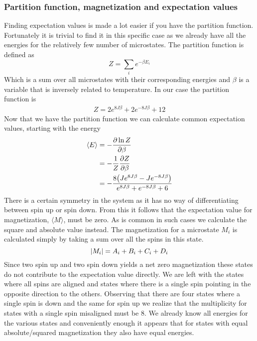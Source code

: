\documentclass[a4paper, 12pt]{article}
\begin{document}
{	\subsubsection{Partition function, magnetization and expectation values}
		Finding expectation values is made a lot easier if you have the partition function. Fortunately it is trivial to find it in this specific case as we already have all the energies for the relatively few number of microstates. The partition function is defined as
		\begin{equation}
			Z = \sum_ie^{-\beta E_i}
		\end{equation}
		Which is a sum over all microstates with their corresponding energies and $\beta$ is a variable that is inversely related to temperature. In our case the partition function is
		\begin{align*}
			Z = 2e^{8J\beta}+2e^{-8J\beta}+12
		\end{align*}
		Now that we have the partition function we can calculate common expectation values, starting with the energy
		\begin{align*}
			\langle E \rangle & = - \pdv{\ln{Z}}{\beta}\\
			& = - \frac{1}{Z} \pdv{Z}{\beta} \\
			&= - \frac{8\qty(Je^{8J\beta}-Je^{-8J\beta})}{e^{8J\beta} + e^{-8J\beta} + 6}
		\end{align*}
		There is a certain symmetry in the system as it has no way of differentiating between spin up or spin down. From this it follows that the expectation value for magnetization, $\langle M \rangle$, must be zero. As is common in such cases we calculate the square and absolute value instead. The magnetization for a microstate $M_i$ is calculated simply by taking a sum over all the spins in this state. 
		$$ \abs{M_i} = A_i + B_i + C_i + D_i $$
		Since two spin up and two spin down yields a net zero magnetization these states do not contribute to the expectation value directly. We are left with the states where all spins are aligned and states where there is a single spin pointing in the opposite direction to the others. Observing that there are four states where a single spin is down and the same for spin up we realize that the multiplicity for states with a single spin misaligned must be 8. We already know all energies for the various states and conveniently enough it appears that for states with equal absolute/squared magnetization they also have equal energies.

}
\end{document}
